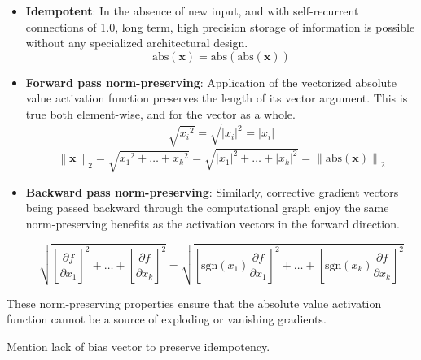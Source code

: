 \documentclass{article}
\begin{document}
\begin{itemize}
\item \textbf{Idempotent}: In the absence of new input, and with self-recurrent connections of 1.0, long term, high precision storage of information is possible without any specialized architectural design.
\begin{equation}
\textrm{abs}(\mathbf{x}) =
\textrm{abs}(\textrm{abs}(\mathbf{x}))
\end{equation}
\item \textbf{Forward pass norm-preserving}: Application of the vectorized absolute value activation function preserves the length of its vector argument. This is true both element-wise, and for the vector as a whole.
\begin{equation}
\sqrt{{x_i}^{2}} = 
\sqrt{{ | x_i | }^{2}} = 
| x_i |
\end{equation}
\begin{equation}
{\left \| \mathbf{x} \right \|}_2 = 
\sqrt{{x_1}^{2} + \dots + {x_k}^2} = 
\sqrt{{|x_1|}^{2} + \dots + {|x_k|}^2} =
{\left \| \textrm{abs}( \mathbf{x} ) \right \|}_2
\end{equation}
\item \textbf{Backward pass norm-preserving}: Similarly, corrective gradient vectors being passed backward through the computational graph enjoy the same norm-preserving benefits as the activation vectors in the forward direction.


\begin{equation}
\sqrt{{ \left [ \frac{\partial f}{\partial x_1} \right ] }^{2} + \dots + { \left [ \frac{\partial f}{\partial x_k} \right ] }^{2}} = 
\sqrt{{\left [ \textrm{sgn} \left ( x_1 \right ) \frac{\partial f}{\partial x_1} \right ] }^{2} + \dots + {\left [ \textrm{sgn} \left ( x_k \right ) \frac{\partial f}{\partial x_k} \right ] }^{2}}
\end{equation}

\end{itemize}

These norm-preserving properties ensure that the absolute value activation function cannot be a source of exploding or vanishing gradients.

Mention lack of bias vector to preserve idempotency.
\end{document}

